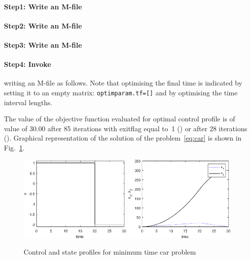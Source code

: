 \paragraph{Step1: Write an M-file~}

{\small }

\paragraph{Step2: Write an M-file~}

{\small }

\paragraph{Step3: Write an M-file~}

{\small }

\paragraph{Step4: Invoke~} writing an M-file
 as follows. Note that optimising the final time is
indicated by setting it to an empty matrix: \verb+optimparam.tf=[]+
and by optimising the time interval lengths. 

{\small }

The value of the objective function evaluated for optimal control
profile is of value of 30.00 after 85 iterations with exitflag equal
to~1 () or after 28 iterations (). Graphical
representation of the solution of the problem~\eqref{eq:car} is shown
in Fig.~\ref{fig:car}.

\begin{figure}[htb]
\includegraphics[width=0.49\textwidth]{examples/problem-car/car_u.eps}
\includegraphics[width=0.49\textwidth]{examples/problem-car/car_x.eps}
\caption{Control and state profiles for minimum time car
  problem} \label{fig:car}
\end{figure}


